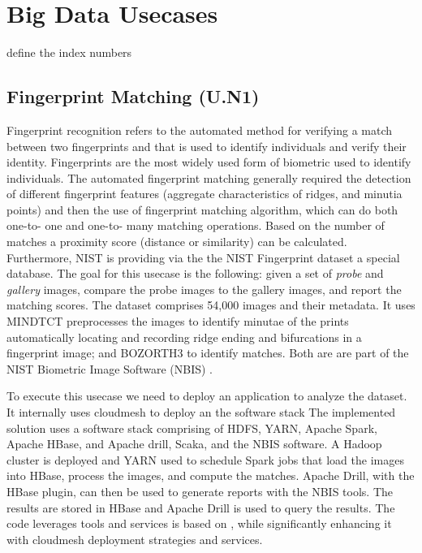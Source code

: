 \section{Big Data Usecases}


define the index numbers

\subsection{Fingerprint Matching (U.N1)}

Fingerprint recognition refers to the automated method for verifying a
match between two fingerprints and that is used to identify
individuals and verify their identity. Fingerprints are the most
widely used form of biometric used to identify individuals. The
automated fingerprint matching generally required the detection of
different fingerprint features (aggregate characteristics of ridges,
and minutia points) and then the use of fingerprint matching
algorithm, which can do both one-to- one and one-to- many matching
operations. Based on the number of matches a proximity score (distance
or similarity) can be calculated. Furthermore, NIST is providing via
the the NIST Fingerprint dataset a special database. The goal for this
usecase is the following: given a set of {\it probe} and {\it gallery}
images, compare the probe images to the gallery images, and report the
matching scores.  The dataset comprises 54,000 images and their
metadata.  It uses MINDTCT \cite{Hyungro:??} preprocesses the images
to identify minutae of the prints automatically locating and recording
ridge ending and bifurcations in a fingerprint image; and BOZORTH3
\cite{Hyungro:??} to identify matches. Both are are part of the NIST
Biometric Image Software (NBIS) \cite{Hyungro:??}.

To execute this usecase we need to deploy an application to analyze
the dataset. It internally uses cloudmesh to deploy an the software
stack The implemented \cite{??} 
solution uses a software stack comprising of HDFS, YARN, Apache Spark,
Apache HBase, and Apache drill, Scaka, and the NBIS software. A Hadoop
cluster is deployed and YARN used to schedule Spark jobs that load the
images into HBase, process the images, and compute the matches. Apache
Drill, with the HBase plugin, can then be used to generate reports
with the NBIS tools\cite{??}. The results are stored in HBase and
Apache Drill \cite{??} is used to query the results.  The code
leverages tools and services is based on \cite{??}   , while significantly
enhancing it with cloudmesh deployment strategies and services.

